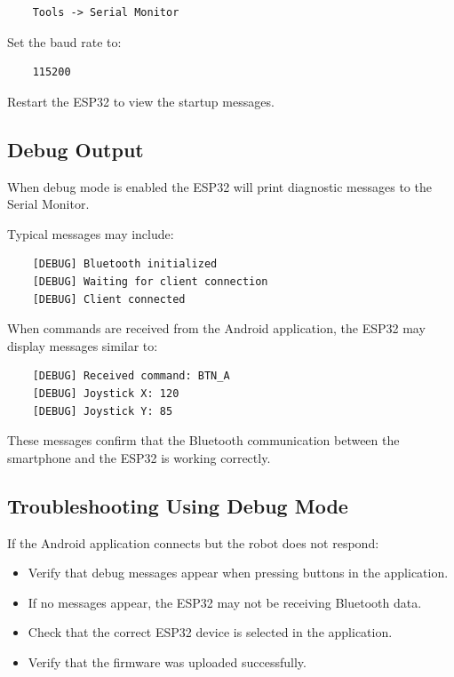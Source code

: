 \begin{verbatim}
	Tools -> Serial Monitor
\end{verbatim}

Set the baud rate to:

\begin{verbatim}
	115200
\end{verbatim}

Restart the ESP32 to view the startup messages.

\subsection{Debug Output}

When debug mode is enabled the ESP32 will print diagnostic messages to the Serial Monitor.

Typical messages may include:

\begin{verbatim}
	[DEBUG] Bluetooth initialized
	[DEBUG] Waiting for client connection
	[DEBUG] Client connected
\end{verbatim}

When commands are received from the Android application, the ESP32 may display messages similar to:

\begin{verbatim}
	[DEBUG] Received command: BTN_A
	[DEBUG] Joystick X: 120
	[DEBUG] Joystick Y: 85
\end{verbatim}

These messages confirm that the Bluetooth communication between the smartphone and the ESP32 is working correctly.

\subsection{Troubleshooting Using Debug Mode}

If the Android application connects but the robot does not respond:

\begin{itemize}
	\item Verify that debug messages appear when pressing buttons in the application.
	\item If no messages appear, the ESP32 may not be receiving Bluetooth data.
	\item Check that the correct ESP32 device is selected in the application.
	\item Verify that the firmware was uploaded successfully.
\end{itemize}

